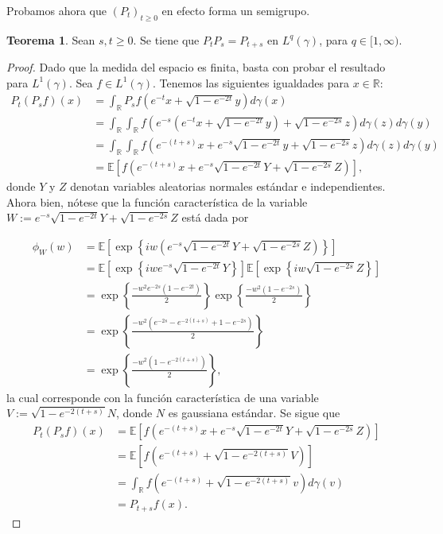 \documentclass[letterpaper,twoside,12pt]{book}
\newcommand{\R}{\mathbb{R}}
\newcommand{\E}{\mathbb{E}}
\newcommand{\1}{\mathds{1}}
\theoremstyle{definition}
\theoremstyle{definition}
\newtheorem{teo}{Teorema}
\theoremstyle{definition}
\theoremstyle{definition}
\theoremstyle{definition}
\theoremstyle{definition}
\theoremstyle{definition}
\begin{document}
Probamos ahora que $(P_t)_{t\geq0}$ en efecto forma un semigrupo.
\begin{teo} 
 Sean $s,t\geq0$. Se tiene que $P_tP_s=P_{t+s}$ en $L^q(\gamma)$, para $q\in [1,\infty)$.
 \end{teo}
 \begin{proof} 
   Dado que la medida del espacio es finita, basta con probar el resultado para $L^1(\gamma)$. Sea $f\in L^1(\gamma)$. Tenemos las siguientes igualdades para $x\in \R$:
\begin{align*}
    P_{t}(P_sf)(x)&=\int_\R P_sf\left(e^{-t}x+\sqrt{1-e^{-2t}}y\right)d\gamma(x)\\
    &=\int_\R \int_\R f\left(e^{-s}(e^{-t}x+\sqrt{1-e^{-2t}}y)+\sqrt{1-e^{-2s}}z\right)d\gamma(z)d\gamma(y)\\
    &=\int_\R\int_\R f \left(e^{-(t+s)}x+e^{-s}\sqrt{1-e^{-2t}}y+\sqrt{1-e^{-2s}}z\right)d\gamma(z)d\gamma(y)\\
    &=\E\left[f \left(e^{-(t+s)}x+e^{-s}\sqrt{1-e^{-2t}}Y+\sqrt{1-e^{-2s}}Z\right)\right],
\end{align*}
donde $Y$ y $Z$ denotan variables aleatorias normales estándar e independientes. Ahora bien, nótese que la función característica de la variable $W:=e^{-s}\sqrt{1-e^{-2t}}Y+\sqrt{1-e^{-2s}}Z$ está dada por 

\begin{align*}
    \phi_W(w)&=\E\left[\exp \left\{iw(e^{-s}\sqrt{1-e^{-2t}}Y+\sqrt{1-e^{-2s}}Z)\right\}\right]\\
    &=\E\left[\exp \left\{iwe^{-s}\sqrt{1-e^{-2t}}Y\right\}\right]\E\left[\exp \left\{iw\sqrt{1-e^{-2s}}Z\right\}\right]\\
    &=\exp \left\{\frac{-w^2e^{-2s}(1-e^{-2t})}{2}\right\}\exp \left\{\frac{-w^2(1-e^{-2s})}{2}\right\}\\
    &=\exp \left\{\frac{-w^2(e^{-2s}-e^{-2(t+s)}+1-e^{-2s})}{2}\right\}\\
    &=\exp \left\{\frac{-w^2(1-e^{-2(t+s)})}{2}\right\},
\end{align*}
la cual corresponde con la función característica de una variable $V:=\sqrt{1-e^{-2(t+s)}}N$, donde $N$ es gaussiana estándar. Se sigue que 
\begin{align*}
    P_{t}(P_sf)(x)&=\E\left[f \left(e^{-(t+s)}x+e^{-s}\sqrt{1-e^{-2t}}Y+\sqrt{1-e^{-2s}}Z\right)\right]\\
    &=\E\left[f \left(e^{-(t+s)}+\sqrt{1-e^{-2(t+s)}}V\right)\right]\\
    &=\int_\R f \left(e^{-(t+s)}+\sqrt{1-e^{-2(t+s)}}v\right)d\gamma(v)\\
    &=P_{t+s}f(x).
\end{align*}
  \end{proof}
\end{document}
